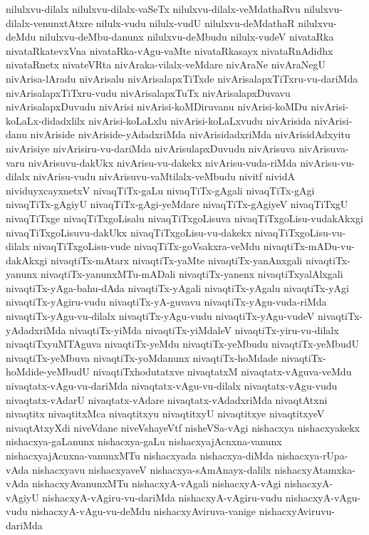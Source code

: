 {nilulxvu-dilalx
nilulxvu-dilalx-vaSeTx
nilulxvu-dilalx-veMdathaRvu
nilulxvu-dilalx-venunxtAtxre
nilulx-vudu
nilulx-vudU
nilulxvu-deMdathaR
nilulxvu-deMdu
nilulxvu-deMbu-danunx
nilulxvu-deMbudu
nilulx-vudeV
nivataRka
nivataRkatevxVna
nivataRka-vAgu-vaMte
nivataRkasayx
nivataRnAdidhx
nivataRnetx
nivateVRta
nivAraka-vilalx-veMdare
nivAraNe
nivAraNegU
nivArisa-lAradu
nivArisalu
nivArisalapxTiTxde
nivArisalapxTiTxru-vu-dariMda
nivArisalapxTiTxru-vudu
nivArisalapxTuTx
nivArisalapxDuvavu
nivArisalapxDuvudu
nivArisi
nivArisi-koMDiruvanu
nivArisi-koMDu
nivArisi-koLaLx-didadxlilx
nivArisi-koLaLxlu
nivArisi-koLaLxvudu
nivArisida
nivArisi-danu
nivAriside
nivAriside-yAdadxriMda
nivArisidadxriMda
nivArisidAdxyitu
nivArisiye
nivArisiru-vu-dariMda
nivArisulapxDuvudu
nivArisuva
nivArisuva-varu
nivArisuvu-dakUkx
nivArisu-vu-dakekx
nivArisu-vuda-riMda
nivArisu-vu-dilalx
nivArisu-vudu
nivArisuvu-vaMtilalx-veMbudu
nivitf
nividA
nividuyxcayxnetxV
nivaqTiTx-gaLu
nivaqTiTx-gAgali
nivaqTiTx-gAgi
nivaqTiTx-gAgiyU
nivaqTiTx-gAgi-yeMdare
nivaqTiTx-gAgiyeV
nivaqTiTxgU
nivaqTiTxge
nivaqTiTxgoLisalu
nivaqTiTxgoLisuva
nivaqTiTxgoLisu-vudakAkxgi
nivaqTiTxgoLisuvu-dakUkx
nivaqTiTxgoLisu-vu-dakekx
nivaqTiTxgoLisu-vu-dilalx
nivaqTiTxgoLisu-vude
nivaqTiTx-goVsakxra-veMdu
nivaqtiTx-mADu-vu-dakAkxgi
nivaqtiTx-mAtarx
nivaqtiTx-yaMte
nivaqtiTx-yanAnxgali
nivaqtiTx-yanunx
nivaqtiTx-yanunxMTu-mADali
nivaqtiTx-yanenx
nivaqtiTxyalAlxgali
nivaqtiTx-yAga-bahu-dAda
nivaqtiTx-yAgali
nivaqtiTx-yAgalu
nivaqtiTx-yAgi
nivaqtiTx-yAgiru-vudu
nivaqtiTx-yA-guvavu
nivaqtiTx-yAgu-vuda-riMda
nivaqtiTx-yAgu-vu-dilalx
nivaqtiTx-yAgu-vudu
nivaqtiTx-yAgu-vudeV
nivaqtiTx-yAdadxriMda
nivaqtiTx-yiMda
nivaqtiTx-yiMdaleV
nivaqtiTx-yiru-vu-dilalx
nivaqtiTxyuMTAguva
nivaqtiTx-yeMdu
nivaqtiTx-yeMbudu
nivaqtiTx-yeMbudU
nivaqtiTx-yeMbuva
nivaqtiTx-yoMdanunx
nivaqtiTx-hoMdade
nivaqtiTx-hoMdide-yeMbudU
nivaqtiTxhodutatxve
nivaqtatxM
nivaqtatx-vAguva-veMdu
nivaqtatx-vAgu-vu-dariMda
nivaqtatx-vAgu-vu-dilalx
nivaqtatx-vAgu-vudu
nivaqtatx-vAdarU
nivaqtatx-vAdare
nivaqtatx-vAdadxriMda
nivaqtAtxni
nivaqtitx
nivaqtitxMca
nivaqtitxyu
nivaqtitxyU
nivaqtitxye
nivaqtitxyeV
nivaqtAtxyXdi
niveVdane
niveVshayeVtf
nisheVSa-vAgi
nishacxya
nishacxyakekx
nishacxya-gaLanunx
nishacxya-gaLu
nishacxyajAcnxna-vanunx
nishacxyajAcnxna-vanunxMTu
nishacxyada
nishacxya-diMda
nishacxya-rUpa-vAda
nishacxyavu
nishacxyaveV
nishacxya-sAmAnayx-dalilx
nishacxyAtamxka-vAda
nishacxyAvanunxMTu
nishacxyA-vAgali
nishacxyA-vAgi
nishacxyA-vAgiyU
nishacxyA-vAgiru-vu-dariMda
nishacxyA-vAgiru-vudu
nishacxyA-vAgu-vudu
nishacxyA-vAgu-vu-deMdu
nishacxyAviruva-vanige
nishacxyAviruvu-dariMda
}

